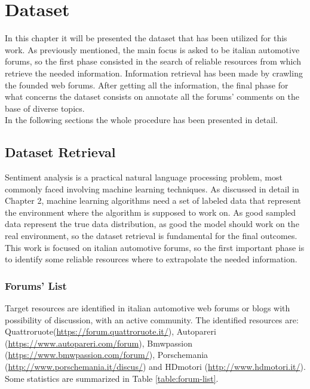 
\chapter{Dataset}

In this chapter it will be presented the dataset that has been utilized for this work. As previously mentioned, the main focus is asked to be italian automotive forums, so the first phase consisted in the search of reliable resources from which retrieve the needed information. Information retrieval has been made by crawling the founded web forums. After getting all the information, the final phase for what concerns the dataset consists on annotate all the forums' comments on the base of diverse topics. \\
In the following sections the whole procedure has been presented in detail.

\section{Dataset Retrieval}

Sentiment analysis is a practical natural language processing problem, most commonly faced involving machine learning techniques. As discussed in detail in Chapter 2, machine learning algorithms need a set of labeled data that represent the environment where the algorithm is supposed to work on. As good sampled data represent the true data distribution, as good the model should work on the real environment, so the dataset retrieval is fundamental for the final outcomes.\\
This work is focused on italian automotive forums, so the first important phase is to identify some reliable resources where to extrapolate the needed information. 


\subsection{Forums' List}

Target resources are identified in italian automotive web forums or blogs with possibility of discussion, with an active community. The identified resources are: Quattroruote(\url{https://forum.quattroruote.it/}), Autopareri (\url{https://www.autopareri.com/forum}), Bmwpassion (\url{https://www.bmwpassion.com/forum/}), Porschemania (\url{http://www.porschemania.it/discus/}) and HDmotori (\url{http://www.hdmotori.it/}). 
Some statistics are summarized in Table \ref{table:forum-list}.

